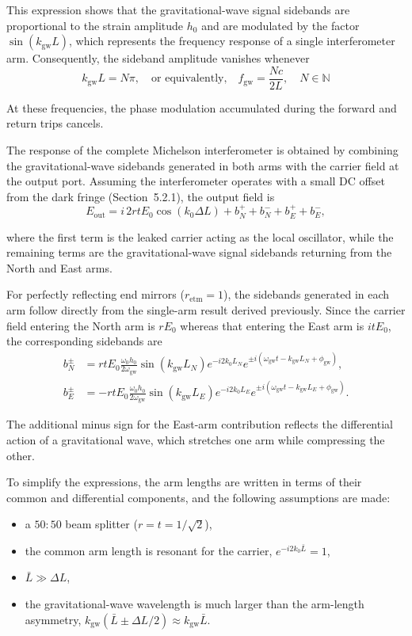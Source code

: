 \documentclass{report}
\begin{document}
This expression shows that the gravitational-wave signal sidebands are proportional to the strain amplitude $h_0$ and are modulated by the factor $\sin(k_{\mathrm{gw}}L)$, which represents the frequency response of a single interferometer arm. Consequently, the sideband amplitude vanishes whenever
\begin{equation}
k_{\mathrm{gw}}L=N\pi,
\quad
\text{or equivalently,}
\quad
f_{\mathrm{gw}}
=
\frac{Nc}{2L},
\quad N \in \mathbb{N}
\end{equation}

At these frequencies, the phase modulation accumulated during the forward and return trips cancels.

The response of the complete Michelson interferometer is obtained by combining the gravitational-wave sidebands generated in both arms with the carrier field at the output port. Assuming the interferometer operates with a small DC offset from the dark fringe (Section~5.2.1), the output field is
\begin{equation}
E_{\mathrm{out}}
=
i\,2rtE_0\cos(k_0\Delta L)
+b_N^{+}+b_N^{-}+b_E^{+}+b_E^{-},
\end{equation}

where the first term is the leaked carrier acting as the local oscillator, while the remaining terms are the gravitational-wave signal sidebands returning from the North and East arms.

For perfectly reflecting end mirrors ($r_{\mathrm{etm}}=1$), the sidebands generated in each arm follow directly from the single-arm result derived previously. Since the carrier field entering the North arm is $rE_0$ whereas that entering the East arm is $itE_0$, the corresponding sidebands are
\begin{align}
b_N^{\pm}
&=
rtE_0
\frac{\omega_0h_0}{2\omega_{\mathrm{gw}}}
\sin(k_{\mathrm{gw}}L_N)
e^{-i2k_0L_N}
e^{\pm i(\omega_{\mathrm{gw}}t-k_{\mathrm{gw}}L_N+\phi_{\mathrm{gw}})},
\\
b_E^{\pm}
&=
-rtE_0
\frac{\omega_0h_0}{2\omega_{\mathrm{gw}}}
\sin(k_{\mathrm{gw}}L_E)
e^{-i2k_0L_E}
e^{\pm i(\omega_{\mathrm{gw}}t-k_{\mathrm{gw}}L_E+\phi_{\mathrm{gw}})}.
\end{align}

The additional minus sign for the East-arm contribution reflects the differential action of a gravitational wave, which stretches one arm while compressing the other.

To simplify the expressions, the arm lengths are written in terms of their common and differential components, and the following assumptions are made:
\begin{itemize}
\item a $50{:}50$ beam splitter ($r=t=1/\sqrt{2}$),
\item the common arm length is resonant for the carrier,
      $e^{-i2k_0\bar L}=1$,
\item $\bar L\gg\Delta L$,
\item the gravitational-wave wavelength is much larger than the arm-length asymmetry,
      $k_{\mathrm{gw}}(\bar L\pm\Delta L/2)\approx k_{\mathrm{gw}}\bar L$.
\end{itemize}
\end{document}
